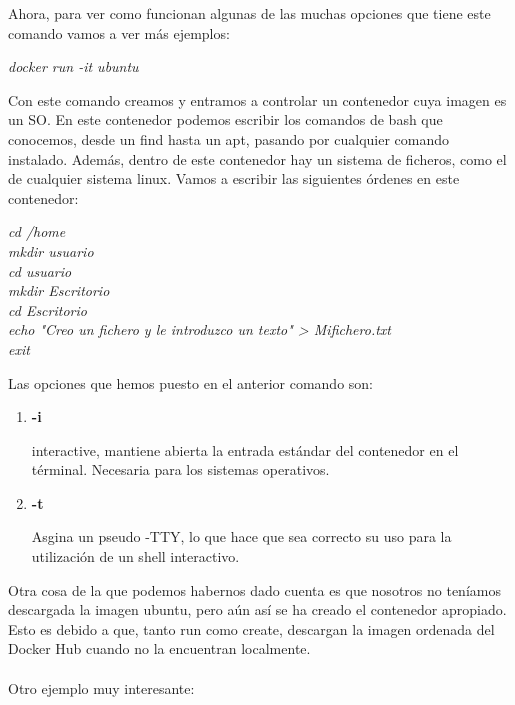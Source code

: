 \documentclass[]{article}
\begin{document}
Ahora, para ver como funcionan algunas de las muchas opciones que tiene este comando vamos a ver más ejemplos:

\begin{center}

	\it	docker run -it ubuntu
	
\end{center}

Con este comando creamos y entramos a controlar un contenedor cuya imagen es un SO. En este contenedor podemos escribir los comandos de bash que conocemos, desde un find hasta un apt, pasando por cualquier comando instalado. Además, dentro de este contenedor hay un sistema de ficheros, como el de cualquier sistema linux. Vamos a escribir las siguientes órdenes en este contenedor:
\begin{center}
	
	\it
	cd /home\\
	mkdir usuario\\
	cd usuario\\
	mkdir Escritorio\\
	cd Escritorio\\
	echo "Creo un fichero y le introduzco un texto" > Mifichero.txt\\
	exit

\end{center}
Las opciones que hemos puesto en el anterior comando son:
\begin{enumerate}
\renewcommand{\labelenumi}{$ \bullet $}

\item {\bf -i}

interactive, mantiene abierta la entrada estándar del contenedor en el términal. Necesaria para los sistemas operativos.
\item {\bf -t}

Asgina un pseudo -TTY, lo que hace que sea correcto su uso para la utilización de un shell interactivo.

\end{enumerate}
Otra cosa de la que podemos habernos dado cuenta es que nosotros no teníamos descargada la imagen ubuntu, pero aún así se ha creado el contenedor apropiado.
Esto es debido a que, tanto run como create, descargan la imagen ordenada del Docker Hub cuando no la encuentran localmente.
\\\\

Otro ejemplo muy interesante:
\end{document}
